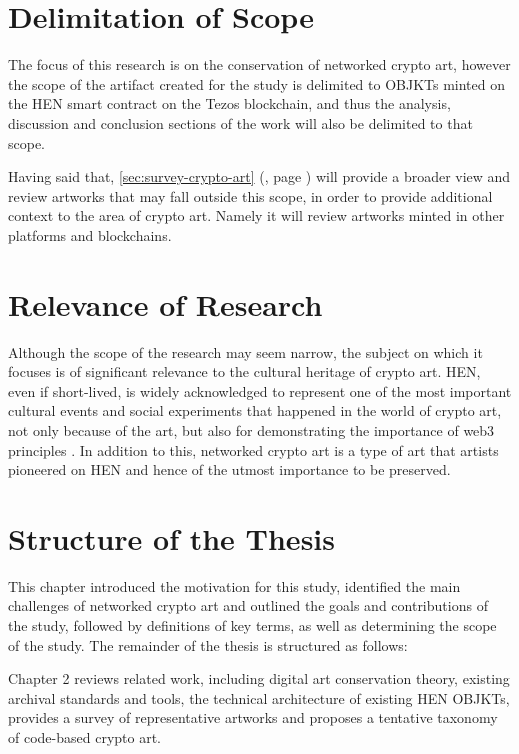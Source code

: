 \section{Delimitation of Scope}

The focus of this research is on the conservation of networked crypto art, however the scope of the artifact created for the study is delimited to OBJKTs minted on the HEN smart contract on the Tezos blockchain, and thus the analysis, discussion and conclusion sections of the work will also be delimited to that scope.

Having said that, \autoref{sec:survey-crypto-art} (, page \pageref{sec:survey-crypto-art})  will provide a broader view and review artworks that may fall outside this scope, in order to provide additional context to the area of crypto art. Namely it will review artworks minted in other platforms and blockchains.

\section{Relevance of Research}

Although the scope of the research may seem narrow, the subject on which it focuses is of significant relevance to the cultural heritage of crypto art.
HEN, even if short-lived, is widely acknowledged to represent one of the most important cultural events and social experiments that happened in the world of crypto art, not only because of the art, but also for demonstrating the importance of web3 principles \cite{rcsEarlyDaysHic2023} \cite{baileyHicNuncBrings2021} \cite{drubayHowHicNunc2021}.
In addition to this, networked crypto art is a type of art that artists pioneered on HEN and hence of the utmost importance to be preserved.

\section{Structure of the Thesis}

This chapter introduced the motivation for this study, identified the main challenges of networked crypto art and outlined the goals and contributions of the study, followed by definitions of key terms, as well as determining the scope of the study. The remainder of the thesis is structured as follows:

Chapter 2 reviews related work, including digital art conservation theory, existing archival standards and tools, the technical architecture of existing HEN OBJKTs, provides a survey of representative artworks and proposes a tentative taxonomy of code-based crypto art.

